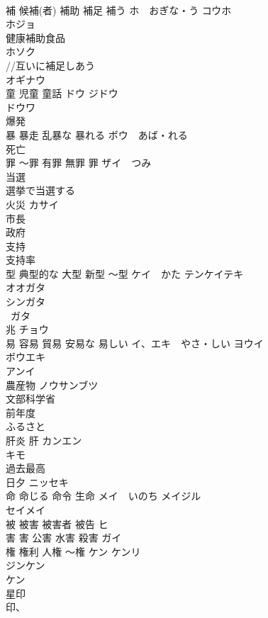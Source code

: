 \documentclass[8pt]{extreport}
\begin{document}
\begin{CJK}{UTF8}{min}
\\	補 候補(者) 補助 補足 補う	ホ　おぎな・う コウホ 
\\	ホジョ 
\\	健康補助食品 
\\	ホソク 
\\	//互いに補足しあう
\\	オギナウ 
\\	童 児童 童話	ドウ ジドウ 
\\	ドウワ 
\\	爆発	
\\	暴 暴走 乱暴な 暴れる	ボウ　あば・れる 
\\	死亡	
\\	罪 〜罪 有罪 無罪 罪	ザイ　つみ 
\\	当選	
\\	選挙で当選する
\\	火災	カサイ 
\\	市長	
\\	政府	
\\	支持	
\\	支持率 
\\	型 典型的な 大型 新型 〜型	ケイ　かた テンケイテキ 
\\	オオガタ
\\	シンガタ
\\	~ガタ 
\\	兆	チョウ 
\\	易 容易 貿易 安易な 易しい	イ、エキ　やさ・しい ヨウイ 
\\	ボウエキ 
\\	アンイ
\\	農産物	ノウサンブツ 
\\	文部科学省	
\\	前年度	
\\	ふるさと	
\\	肝炎 肝	カンエン 
\\	キモ 
\\	過去最高	
\\	日夕	ニッセキ 
\\	命 命じる 命令 生命	メイ　いのち メイジル 
\\	セイメイ 
\\	被 被害 被害者 被告	ヒ 
\\	害 害 公害 水害 殺害	ガイ 
\\	権 権利 人権 〜権	ケン ケンリ
\\	ジンケン
\\	ケン 
\\	星印	
\\	印、

\end{CJK}
\end{document}
